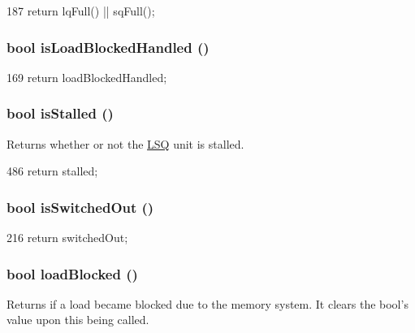 \begin{DoxyCode}
187 { return lqFull() || sqFull(); }
\end{DoxyCode}
\hypertarget{classOzoneLWLSQ_ad0aa91a7b51ca925abf9c9992abad314}{
\subsubsection[{isLoadBlockedHandled}]{\setlength{\rightskip}{0pt plus 5cm}bool isLoadBlockedHandled ()}}
\label{classOzoneLWLSQ_ad0aa91a7b51ca925abf9c9992abad314}



\begin{DoxyCode}
169     { return loadBlockedHandled; }
\end{DoxyCode}
\hypertarget{classOzoneLWLSQ_af8eb8590fbfa6ecd2f796390677a4c00}{
\subsubsection[{isStalled}]{\setlength{\rightskip}{0pt plus 5cm}bool isStalled ()}}
\label{classOzoneLWLSQ_af8eb8590fbfa6ecd2f796390677a4c00}
Returns whether or not the \hyperlink{classLSQ}{LSQ} unit is stalled. 


\begin{DoxyCode}
486 { return stalled; }
\end{DoxyCode}
\hypertarget{classOzoneLWLSQ_a471165257f311a78136ce991a3bad31a}{
\subsubsection[{isSwitchedOut}]{\setlength{\rightskip}{0pt plus 5cm}bool isSwitchedOut ()}}
\label{classOzoneLWLSQ_a471165257f311a78136ce991a3bad31a}



\begin{DoxyCode}
216 { return switchedOut; }
\end{DoxyCode}
\hypertarget{classOzoneLWLSQ_a05c413ba417c6453e99f75d87c958590}{
\subsubsection[{loadBlocked}]{\setlength{\rightskip}{0pt plus 5cm}bool loadBlocked ()}}
\label{classOzoneLWLSQ_a05c413ba417c6453e99f75d87c958590}
Returns if a load became blocked due to the memory system. It clears the bool's value upon this being called. 


